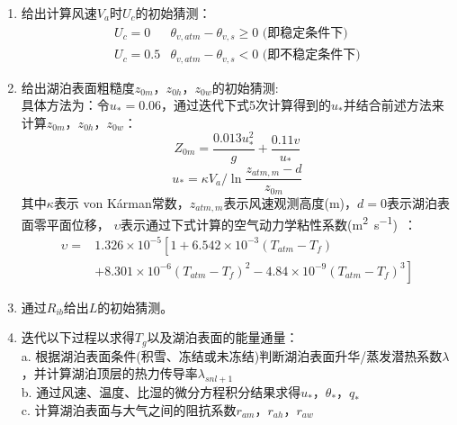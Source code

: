 \begin{enumerate}
    \item 给出计算风速$V_a$时$U_c$的初始猜测：
        \begin{equation}
        \begin{array}{ll}
            U_{c}=0 & \theta_{v, atm}-\theta_{v, s} \geqslant 0 \text{ (即稳定条件下)} \\
            U_{c}=0.5 & \theta_{v, atm}-\theta_{v, s}<0 \text{ (即不稳定条件下)}
        \end{array}
        \end{equation}
    \item 给出湖泊表面粗糙度$z_{0m}$，$z_{0h}$，$z_{0w}$的初始猜测:\\
        具体方法为：令$u_\ast=0.06$，通过迭代下式5次计算得到的$u_\ast$并结合前述方法来计算$z_{0m}$，$z_{0h}$，$z_{0w}$：
        \begin{equation}
        Z_{0 m}=\frac{0.013 u_{*}^{2}}{g}+\frac{0.11 v}{u_{*}}
        \end{equation}
        \begin{equation}
        u_{*}=\kappa V_{a} / \ln \frac{z_{atm, m}-d}{z_{0 m}}
        \end{equation}
        其中$\kappa$表示 von K\'arman常数，$z_{atm,m}$表示风速观测高度(m)，$d=0$表示湖泊表面零平面位移，
        $\upsilon$表示通过下式计算的空气动力学粘性系数(\unit{m^2.s^{-1}})~\citep{andreas1989thermal}：
        \begin{equation}
            \begin{array}{cl}
            \upsilon=&1.326\times{10}^{-5}\left[1+6.542\times{10}^{-3}\left(T_{atm}-T_f\right)\right.\\
                           & \left. +8.301\times{10}^{-6}\left(T_{atm}-T_f\right)^2-4.84\times{10}^{-9}\left(T_{atm}-T_f\right)^3\right]
            \end{array}
        \end{equation}
    \item 通过$R_{ib}$给出$L$的初始猜测。
    \item 迭代以下过程以求得$T_g$以及湖泊表面的能量通量：\\
    a. 根据湖泊表面条件(积雪、冻结或未冻结)判断湖泊表面升华/蒸发潜热系数$\lambda$，并计算湖泊顶层的热力传导率$\lambda_{snl+1}$ \\
    b. 通过风速、温度、比湿的微分方程积分结果求得$u_\ast$，$\theta_\ast$，$q_\ast$ \\
    c. 计算湖泊表面与大气之间的阻抗系数$r_{am}$，$r_{ah}$，$r_{aw}$ \\

\end{enumerate}
